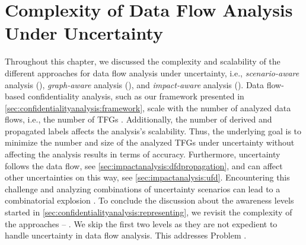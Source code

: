 




\section{Complexity of Data Flow Analysis Under Uncertainty}%
\label{sec:confidentialityanalysis:complexity}

Throughout this chapter, we discussed the complexity and scalability of the different approaches for data flow analysis under uncertainty, i.e., \emph{scenario-aware} analysis (), \emph{graph-aware} analysis (), and \emph{impact-aware} analysis ().
Data flow-based confidentiality analysis, such as our framework presented in \autoref{sec:confidentialityanalysis:framework}, scale with the number of analyzed data flows, i.e., the number of \acp{TFG} \cite{schwickerath_tool-supported_2023,boltz_extensible_2024}.
Additionally, the number of derived and propagated labels affects the analysis's scalability.
Thus, the underlying goal is to minimize the number and size of the analyzed \acp{TFG} under uncertainty without affecting the analysis results in terms of accuracy.
Furthermore, uncertainty follows the data flow, see \autoref{sec:impactanalysis:dfdpropagation}, and can affect other uncertainties on this way, see \autoref{sec:impactanalysis:ufd}.
Encountering this challenge and analyzing combinations of uncertainty scenarios can lead to a combinatorial explosion \cite{koziolek_automated_2011}.
To conclude the discussion about the awareness levels started in \autoref{sec:confidentialityanalysis:representing}, we revisit the complexity of the approaches  -- .
We skip the first two levels as they are not expedient to handle uncertainty in data flow analysis.
This addresses Problem .

